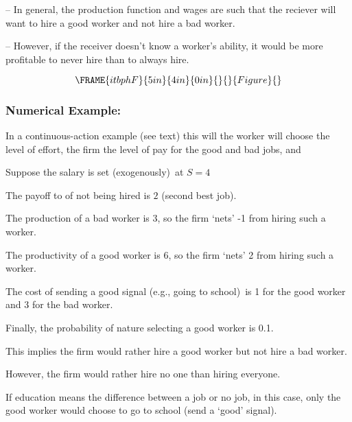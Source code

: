 \documentclass{article}
\begin{document}
-- In general, the production function and wages are such that the reciever
will want to hire a good worker and not hire a bad worker.

-- However, if the receiver doesn't know a worker's ability, it would be
more profitable to never hire than to always hire.

\bigskip

\pagebreak

\begin{equation}
\FRAME{itbphF}{5in}{4in}{0in}{}{}{Figure}{\special{language "Scientific
Word";type "GRAPHIC";maintain-aspect-ratio TRUE;display "USEDEF";valid_file
"T";width 5in;height 4in;depth 0in;original-width 7.3172in;original-height
4.9078in;cropleft "0";croptop "1";cropright "1";cropbottom "0";tempfilename
'JSH1WT0D.wmf';tempfile-properties "XPR";}}
\end{equation}

\subsubsection{Numerical Example:}

In a continuous-action example (see text) this will the worker will choose
the level of effort, the firm the level of pay for the good and bad jobs, and

\bigskip

Suppose the salary is set (exogenously)\ at $S=4$

The payoff to of not being hired is $2$ (second best job).

The production of a bad worker is $3$, so the firm `nets' -1 from hiring
such a worker.

The productivity of a good worker is $6$, so the firm `nets' 2 from hiring
such a worker.

The cost of sending a good signal (e.g., going to school)\ is 1 for the good
worker and 3 for the bad worker.

\bigskip

Finally, the probability of nature selecting a good worker is 0.1. \ 

This implies the firm would rather hire a good worker but not hire a bad
worker.

However, the firm would rather hire no one than hiring everyone.

\bigskip \pagebreak

If education means the difference between a job or no job, in this case,
only the good worker would choose to go to school (send a `good' signal).
\end{document}
